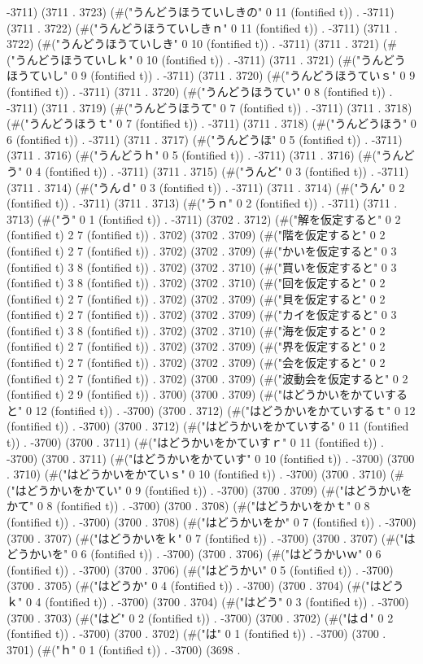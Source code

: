 -3711) (3711 . 3723) (#("うんどうほうていしきの" 0 11 (fontified t)) . -3711) (3711 . 3722) (#("うんどうほうていしきｎ" 0 11 (fontified t)) . -3711) (3711 . 3722) (#("うんどうほうていしき" 0 10 (fontified t)) . -3711) (3711 . 3721) (#("うんどうほうていしｋ" 0 10 (fontified t)) . -3711) (3711 . 3721) (#("うんどうほうていし" 0 9 (fontified t)) . -3711) (3711 . 3720) (#("うんどうほうていｓ" 0 9 (fontified t)) . -3711) (3711 . 3720) (#("うんどうほうてい" 0 8 (fontified t)) . -3711) (3711 . 3719) (#("うんどうほうて" 0 7 (fontified t)) . -3711) (3711 . 3718) (#("うんどうほうｔ" 0 7 (fontified t)) . -3711) (3711 . 3718) (#("うんどうほう" 0 6 (fontified t)) . -3711) (3711 . 3717) (#("うんどうほ" 0 5 (fontified t)) . -3711) (3711 . 3716) (#("うんどうｈ" 0 5 (fontified t)) . -3711) (3711 . 3716) (#("うんどう" 0 4 (fontified t)) . -3711) (3711 . 3715) (#("うんど" 0 3 (fontified t)) . -3711) (3711 . 3714) (#("うんｄ" 0 3 (fontified t)) . -3711) (3711 . 3714) (#("うん" 0 2 (fontified t)) . -3711) (3711 . 3713) (#("うｎ" 0 2 (fontified t)) . -3711) (3711 . 3713) (#("う" 0 1 (fontified t)) . -3711) (3702 . 3712) (#("解を仮定すると" 0 2 (fontified t) 2 7 (fontified t)) . 3702) (3702 . 3709) (#("階を仮定すると" 0 2 (fontified t) 2 7 (fontified t)) . 3702) (3702 . 3709) (#("かいを仮定すると" 0 3 (fontified t) 3 8 (fontified t)) . 3702) (3702 . 3710) (#("買いを仮定すると" 0 3 (fontified t) 3 8 (fontified t)) . 3702) (3702 . 3710) (#("回を仮定すると" 0 2 (fontified t) 2 7 (fontified t)) . 3702) (3702 . 3709) (#("貝を仮定すると" 0 2 (fontified t) 2 7 (fontified t)) . 3702) (3702 . 3709) (#("カイを仮定すると" 0 3 (fontified t) 3 8 (fontified t)) . 3702) (3702 . 3710) (#("海を仮定すると" 0 2 (fontified t) 2 7 (fontified t)) . 3702) (3702 . 3709) (#("界を仮定すると" 0 2 (fontified t) 2 7 (fontified t)) . 3702) (3702 . 3709) (#("会を仮定すると" 0 2 (fontified t) 2 7 (fontified t)) . 3702) (3700 . 3709) (#("波動会を仮定すると" 0 2 (fontified t) 2 9 (fontified t)) . 3700) (3700 . 3709) (#("はどうかいをかていすると" 0 12 (fontified t)) . -3700) (3700 . 3712) (#("はどうかいをかていするｔ" 0 12 (fontified t)) . -3700) (3700 . 3712) (#("はどうかいをかていする" 0 11 (fontified t)) . -3700) (3700 . 3711) (#("はどうかいをかていすｒ" 0 11 (fontified t)) . -3700) (3700 . 3711) (#("はどうかいをかていす" 0 10 (fontified t)) . -3700) (3700 . 3710) (#("はどうかいをかていｓ" 0 10 (fontified t)) . -3700) (3700 . 3710) (#("はどうかいをかてい" 0 9 (fontified t)) . -3700) (3700 . 3709) (#("はどうかいをかて" 0 8 (fontified t)) . -3700) (3700 . 3708) (#("はどうかいをかｔ" 0 8 (fontified t)) . -3700) (3700 . 3708) (#("はどうかいをか" 0 7 (fontified t)) . -3700) (3700 . 3707) (#("はどうかいをｋ" 0 7 (fontified t)) . -3700) (3700 . 3707) (#("はどうかいを" 0 6 (fontified t)) . -3700) (3700 . 3706) (#("はどうかいｗ" 0 6 (fontified t)) . -3700) (3700 . 3706) (#("はどうかい" 0 5 (fontified t)) . -3700) (3700 . 3705) (#("はどうか" 0 4 (fontified t)) . -3700) (3700 . 3704) (#("はどうｋ" 0 4 (fontified t)) . -3700) (3700 . 3704) (#("はどう" 0 3 (fontified t)) . -3700) (3700 . 3703) (#("はど" 0 2 (fontified t)) . -3700) (3700 . 3702) (#("はｄ" 0 2 (fontified t)) . -3700) (3700 . 3702) (#("は" 0 1 (fontified t)) . -3700) (3700 . 3701) (#("ｈ" 0 1 (fontified t)) . -3700) (3698 . 